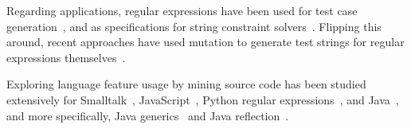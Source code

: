 Regarding applications, regular expressions have been used for test case generation~\cite{Ghosh:2013:JAT:2486788.2486925, Galler:2014:STD:2683035.2683100, Anand:2013:OSM:2503903.2503991, Tillmann:2014:TAT:2642937.2642941},  and
as specifications for string constraint solvers~\cite{Trinh:2014:SSS:2660267.2660372, hampi}.
Flipping this around, recent approaches have used mutation to generate test strings for regular expressions themselves~\cite{7899040}. 

Exploring language feature usage by mining source code has been studied extensively for
Smalltalk~\cite{Callau:2011:DUD:1985441.1985448},
JavaScript~\cite{Richards:2010:ADB:1809028.1806598},
Python regular expressions~\cite{chapman2016},
and Java~\cite{Dyer:2014:MBA:2568225.2568295, Grechanik:2010:EIL:1852786.1852801, Parnin:2013:AUJ:2589712.2589717, Livshits:2005:RAJ:2099708.2099724},
and more specifically,
Java generics~\cite{Parnin:2013:AUJ:2589712.2589717} and
Java reflection~\cite{Livshits:2005:RAJ:2099708.2099724}.




%
%
%
%

%
%
%
%
%

%

